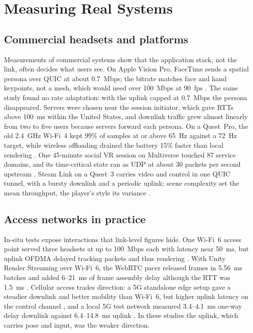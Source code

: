 \section{Measuring Real Systems}\label{sec:measure}

\subsection{Commercial headsets and platforms}
Measurements of commercial systems show that the application stack, not the link, often decides what
users see. On Apple Vision Pro, FaceTime sends a spatial persona over QUIC at about 0.7~Mbps; the bitrate
matches face and hand keypoints, not a mesh, which would need over 100~Mbps at 90~fps
\cite{W4403981191}. The same study found no rate adaptation: with the uplink capped at 0.7~Mbps the
persona disappeared. Servers were chosen near the session initiator, which gave RTTs above 100~ms within
the United States, and downlink traffic grew almost linearly from two to five users because servers
forward each persona. On a Quest~Pro, the old 2.4~GHz Wi-Fi~4 kept 99\% of samples at or above 65~Hz
against a 72~Hz target, while wireless offloading drained the battery 15\% faster than local rendering
\cite{W4362489903}. One 45-minute social VR session on Multiverse touched 87 service domains, and its time-critical state ran as UDP at about
30 packets per second upstream \cite{W4389609035}. Steam Link on a Quest~3 carries video and control in one
QUIC tunnel, with a bursty downlink and a periodic uplink; scene complexity set the mean throughput, the
player's style its variance \cite{W7160626692}.

\subsection{Access networks in practice}
In-situ tests expose interactions that link-level figures hide. One Wi-Fi~6 access point served three
headsets at up to 100~Mbps each with latency near 50~ms, but uplink OFDMA delayed tracking packets and
thus rendering \cite{W4396853623}. With Unity Render Streaming over Wi-Fi~6, the WebRTC pacer released
frames in 5.56~ms batches and added 6--21~ms of frame assembly delay although the RTT was 1.5~ms
\cite{W4391506055}. Cellular access trades direction: a 5G standalone edge setup gave a steadier downlink
and better mobility than Wi-Fi~6, but higher uplink latency on the control channel \cite{W4399563011}, and
a local 5G test network measured 3.4--4.1~ms one-way delay downlink against 6.4--14.8~ms uplink
\cite{W7126117938}. In these studies the uplink, which carries pose and input, was the weaker direction.

